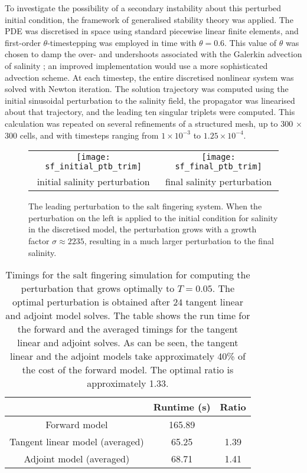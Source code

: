 \documentclass{siamltex}
\begin{document}
To investigate the possibility of a secondary instability about this perturbed initial condition,
the framework of generalised stability theory was applied. The PDE was discretised in space using
standard piecewise linear finite elements, and first-order $\theta$-timestepping was employed in time with
$\theta=0.6$. This value of $\theta$ was chosen to damp the over- and undershoots associated with the Galerkin advection of salinity \cite[\S 5]{davies2005}; an improved
implementation would use a more sophisticated advection scheme. At each timestep, the entire discretised nonlinear system was solved with
Newton iteration. The solution trajectory was computed using the initial sinusoidal perturbation to the
salinity field, the propagator was linearised about that trajectory, and the leading ten singular
triplets were computed. This calculation was repeated on several refinements of a structured mesh,
up to 300 $\times$ 300 cells, and with timesteps ranging from $1 \times 10^{-3}$ to $1.25 \times 10^{-4}$.

\begin{figure}
  \centering
  \begin{tabular}{cc}
    \texttt{[image: sf\_initial\_ptb\_trim]} & \texttt{[image: sf\_final\_ptb\_trim]}
    \\
    initial salinity perturbation & final salinity perturbation
  \end{tabular}
  \caption{The leading perturbation to the salt fingering system. When the perturbation on the left is applied to the initial
    condition for salinity in the discretised model, the perturbation grows with a growth factor $\sigma \approx 2235$, resulting in a much larger perturbation
  to the final salinity.}
  \label{fig:salt_fingering_ptb}
\end{figure}
\begin{table}[t]
\centering
\begin{tabular}{ccc}
\toprule
       & Runtime (s) & Ratio \\
\midrule
Forward model & 165.89 &     \\
Tangent linear model (averaged) & 65.25  & 1.39 \\
Adjoint model (averaged) & 68.71 & 1.41 \\
\bottomrule
\end{tabular}
\caption{Timings for the salt fingering simulation for computing the perturbation that grows optimally to $T = 0.05$. 
  The optimal perturbation is obtained after $24$ tangent linear and adjoint model solves. 
 The table shows the run time for the forward and the averaged timings for the tangent linear and adjoint solves.
  As can be seen, the tangent linear and the adjoint models take approximately 40\% of the cost of the forward model. The
  optimal ratio is approximately 1.33.}
\label{tab:salt_fingering_timings}
\end{table}
\end{document}
